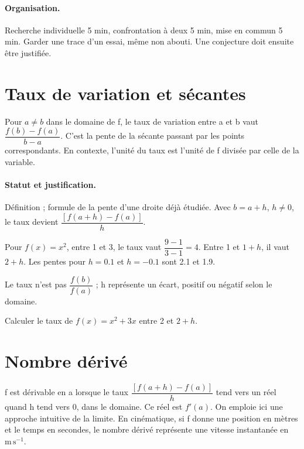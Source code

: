 \paragraph{Organisation.} Recherche individuelle 5 min, confrontation à deux 5 min, mise en commun 5 min. Garder une trace d’un essai, même non abouti. Une conjecture doit ensuite être justifiée.
\mxnewpage
\section{Taux de variation et sécantes}\label{C04-U1}
\begin{keypoint}
Pour $a\ne b$ dans le domaine de f, le taux de variation entre a et b vaut $\dfrac{f(b)-f(a)}{b-a}$. C’est la pente de la sécante passant par les points correspondants. En contexte, l’unité du taux est l’unité de f divisée par celle de la variable.
\end{keypoint}
\paragraph{Statut et justification.} Définition ; formule de la pente d’une droite déjà étudiée. Avec $b=a+h$, $h\ne0$, le taux devient $\dfrac{[f(a+h)-f(a)]}{h}$.
\begin{example}Pour $f(x)=x^2$, entre 1 et 3, le taux vaut $\dfrac{9-1}{3-1}=4$. Entre 1 et $1+h$, il vaut $2+h$. Les pentes pour $h=\num{0,1}$ et $h=-\num{0,1}$ sont \num{2,1} et \num{1,9}.\end{example}\label{C04-EX1}
\begin{pitfall}Le taux n’est pas $\dfrac{f(b)}{f(a)}$ ; h représente un écart, positif ou négatif selon le domaine.\end{pitfall}
\begin{application}Calculer le taux de $f(x)=x^2+3x$ entre 2 et $2+h$.\end{application}\label{C04-AP1}
\section{Nombre dérivé}\label{C04-U2}
\begin{keypoint}
f est dérivable en a lorsque le taux $\dfrac{[f(a+h)-f(a)]}{h}$ tend vers un réel quand h tend vers 0, dans le domaine. Ce réel est $f\prime(a)$. On emploie ici une approche intuitive de la limite. En cinématique, si f donne une position en mètres et le temps en secondes, le nombre dérivé représente une vitesse instantanée en $\mathrm{m\,s^{-1}}$.
\end{keypoint}
